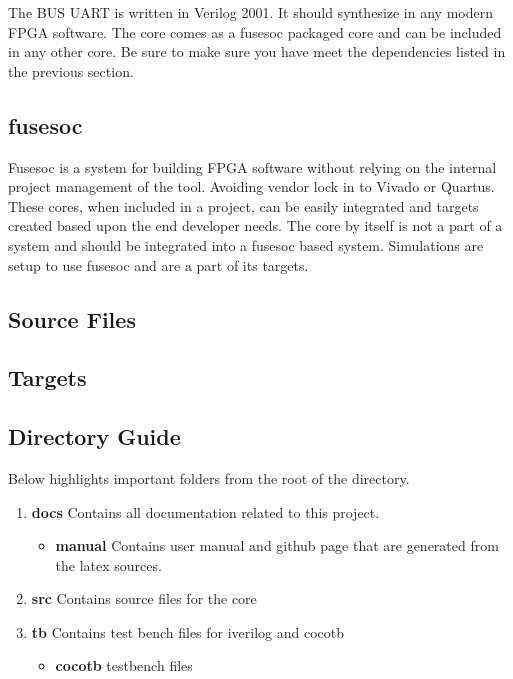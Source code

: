 \par
The BUS UART is written in Verilog 2001. It should synthesize in any modern FPGA software. The core comes as a fusesoc packaged core and can be
included in any other core. Be sure to make sure you have meet the dependencies listed in the previous section.

\subsection{fusesoc}
\par
Fusesoc is a system for building FPGA software without relying on the internal project management of the tool. Avoiding vendor lock in to Vivado or Quartus.
These cores, when included in a project, can be easily integrated and targets created based upon the end developer needs. The core by itself is not a part of
a system and should be integrated into a fusesoc based system. Simulations are setup to use fusesoc and are a part of its targets.

\subsection{Source Files}







\subsection{Targets}







\subsection{Directory Guide}

\par
Below highlights important folders from the root of the directory.

\begin{enumerate}
  \item \textbf{docs} Contains all documentation related to this project.
    \begin{itemize}
      \item \textbf{manual} Contains user manual and github page that are generated from the latex sources.
    \end{itemize}
  \item \textbf{src} Contains source files for the core
  \item \textbf{tb} Contains test bench files for iverilog and cocotb
    \begin{itemize}
      \item \textbf{cocotb} testbench files
    \end{itemize}
\end{enumerate}

